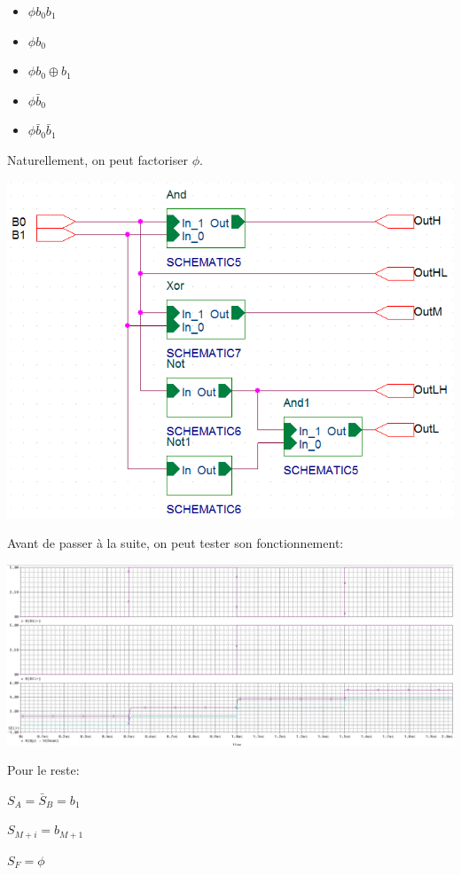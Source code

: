 \documentclass{article}
\begin{document}
\begin{itemize}
    \item $\phi b_0 b_1$
    \item $\phi b_0$
    \item $\phi b_0 \oplus b_1$
    \item $\phi \bar b_0$
    \item $\phi \bar b_0 \bar b_1$
\end{itemize}

\newpage

Naturellement, on peut factoriser $\phi$.

\includegraphics[width=\linewidth]{becancna/dec2.png}

Avant de passer à la suite, on peut tester son fonctionnement:

\includegraphics[width=\linewidth]{becancna/decodeur.jpg}

Pour le reste:

$S_A = \bar S_B = b_1$

$S_{M+i} = b_{M+1}$

$S_F = \phi$
\end{document}
